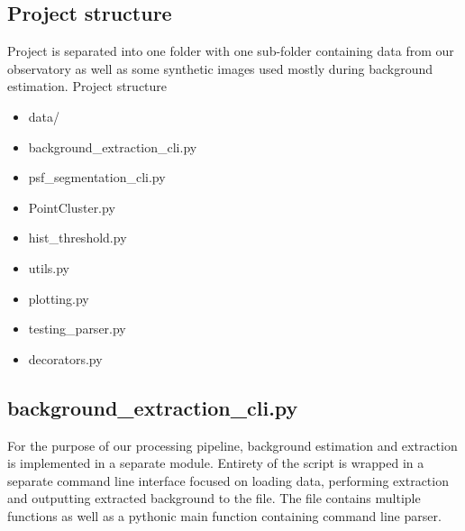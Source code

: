\documentclass[12pt, a4paper, oneside]{book}
\begin{document}
\subsection{Project structure}
Project is separated into one folder with one sub-folder containing data from our observatory as well as some synthetic images used mostly during background estimation.
Project structure\\

\begin{itemize}
    \item data/
    \item background\_extraction\_cli.py %
    \item psf\_segmentation\_cli.py
    \item PointCluster.py
    \item hist\_threshold.py %
    \item utils.py %
    \item plotting.py %
    \item testing\_parser.py
    \item decorators.py %
\end{itemize}

\subsection{background\_extraction\_cli.py}

For the purpose of our processing pipeline, background estimation and extraction is implemented in a separate module.
Entirety of the script is wrapped in a separate command line interface focused on loading data, performing extraction and outputting extracted background to the file.
The file contains multiple functions as well as a pythonic main function containing command line parser.
\end{document}

